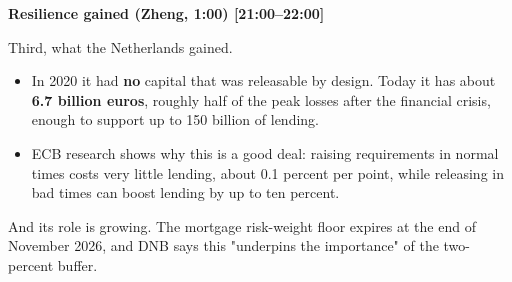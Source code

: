 {\small\textbf{Resilience gained (Zheng, 1:00) [21:00–22:00]}}\par\smallskip
Third, what the Netherlands gained.
\begin{itemize}\setlength\itemsep{0pt}
\item In 2020 it had \textbf{no} capital that was releasable by design. Today it has about \textbf{6.7 billion euros}, roughly half of the peak losses after the financial crisis, enough to support up to 150 billion of lending.
\item ECB research shows why this is a good deal: raising requirements in normal times costs very little lending, about 0.1 percent per point, while releasing in bad times can boost lending by up to ten percent.
\end{itemize}
\par\smallskip
And its role is growing. The mortgage risk-weight floor expires at the end of November 2026, and DNB says this "underpins the importance" of the two-percent buffer.
